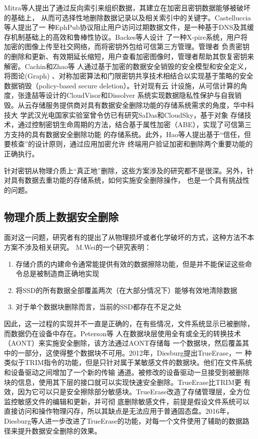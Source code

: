 Mitra等人\cite{Mitra2006Secure}提出了通过反向索引来组织数据，其建立在加密且密钥数据能够被破坏的基础上，
从而可选择性地删除数据记录以及相关索引中的关键字。Castelluccia等人\cite{Castelluccia2011EphPub}提出了一
种EphPub协议阻止用户访问过期数据文件，是一种基于DNS及其缓存机制基础上的高效和鲁棒性协议。Backes等人设计
了一种X-pire系统\cite{Backes2011X}，用户将加密的图像上传至社交网络，而将密钥外包给可信第三方管理。管理者
负责密钥的删除和更新、有效期延长缩短，用户查看加密图像时，管理者帮助其恢复密钥来解密。Cachin和Zhao等
人\cite{Cachin2013Policy,Zhao2015Gracewipe}通过基于加密的数据安全销毁的安全模型和安全定义，将图论(Graph)
、对称加密算法和门限密钥共享技术相结合以实现基于策略的安全数据销毁（policy-based secure deletion）。针对现有云
计设施，从可信计算的角度，张逢喆等设计的CloudVisor\cite{Zhang2011CloudVisor}和Dissolver\cite{张逢喆2011云计算中的数据隐私性保护与自我销毁}
系统实现数据隐私性保护与自我销毁。从云存储服务提供商对具有数据安全删除功能的存储系统需求的角度，华中科技大
学武汉光电国家实验室曾令仿已有研究SaDas\cite{Zeng2013SeDas}和CloudSky\cite{Zeng2015CloudSky}，基于对象
存储技术，通过控制密钥生命周期的方法，结合基于属性加密（ABE），实现了可信第三方支持的具有数据安全删除功能
的存储系统。此外，Hao等人\cite{Feng2016Deleting}提出基于“信任，但要核查”的设计原则，通过应用加密允许
终端用户验证加密和删除两个重要功能的正确执行。

针对密钥从物理介质上“真正地”删除，这些方案涉及的研究都不是很深。另外，针对具有数据去重功能的存储系统，如何实施安全删除操作，
也是一个具有挑战性的问题。
\subsection{物理介质上数据安全删除}
面对这一问题，研究者有的提出了从物理损坏或者化学破坏的方式，这种方法不本方案不涉及相关研究。
M.Wei的一个研究\cite{Wei2011Reliably}表明：
\begin{enumerate}
\item 存储介质的内建命令通常能提供有效的数据擦除功能，但是并不能保证这些命令总是被制造商正确地实现
\item 将SSD的所有数据全部覆盖两次（在大部分情况下）能够有效地清除数据
\item 对于单个数据块删除而言，当前的SSD都存在不足之处
\end{enumerate}


因此，这一过程的实现并不一直是正确的，在有些情况，文件系统显示已被删除，而数据仍在设备中存在。Peterson等
人\cite{Peterson2005Secure}在数据块层使用全有或全无的转换技术（AONT）来实施安全删除，该方法通过AONT存储每
一个数据块，然后覆盖其中的一部分，这使得整个数据块不可用。2012年，Diesburg提出TrueErase\cite{Diesburg2012TrueErase}，一
种类似于TRIM指令的功能，但是只针对属于某敏感文件的数据块。他们在文件系统和设备驱动之间增加了一个新的传输
通道。被修改的设备驱动一旦接受到被删除块的信息，使用其下层的接口就可以实现快速安全删除。TrueErase比TRIM更
有效，因为它可以只是安全擦除部分敏感块。TrueErase改造了存储管理层，全方位监控敏感文件的编辑和更新，并可彻
底删除敏感文件，前提是假设文件系统可以直接访问和操作物理闪存，所以其缺点是无法应用于普通固态盘。2016年，
Diesburg等人进一步改进了TrueErase的功能，对每一个文件使用了辅助的数据路径来提升数据安全删除的效果\cite{diesburg2016trueerase}。


